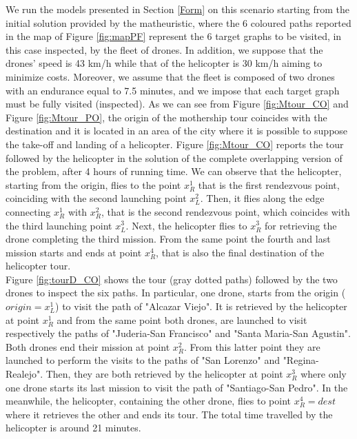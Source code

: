 \documentclass[10pt,a4paper]{elsarticle}
\newcommand{\EN}[1]{{\color{black}#1}}
\begin{document}
\noindent
We run the models presented in Section \ref{Form} on this scenario starting from the initial solution provided by the matheuristic, where the 6 coloured paths reported in the map of Figure \ref{fig:mapPF} represent the 6 target graphs to be visited, in this case inspected, by the fleet of drones. In addition, we suppose that the drones' speed is 43 km/h while that of the helicopter is  30 km/h aiming to minimize costs.
Moreover, we assume that the fleet is composed \EN{of} two drones with an endurance equal to 7.5 minutes, and we impose that each target graph must be fully visited (inspected).  As we can see from Figure \ref{fig:Mtour_CO} and Figure \ref{fig:Mtour_PO}, the origin of the mothership tour coincides with the destination and it is located in an area of the city where it is possible to \EN{suppose} the take-off and landing of \EN{a} helicopter. Figure \ref{fig:Mtour_CO} reports the tour followed by the helicopter in the solution of the complete overlapping version of the problem, after 4 hours of running time. We can observe that the helicopter, starting from the origin, flies to the point $x_R^1$ that is the first rendezvous point, coinciding with the second launching point $x_L^2$. Then, it flies along the edge connecting $x_R^1$ with $x_R^2$, that is the second rendezvous point, which coincides with the third launching point $x_L^3$. Next, the helicopter flies to $x_R^3$ for retrieving the \EN{drone completing the third mission}. From the same point the fourth and last mission starts and ends at point $x_R^4$, that is also the final destination of the helicopter tour.\\
Figure \ref{fig:tourD_CO} shows the tour (gray dotted paths) followed by the two drones \EN{to inspect} the six paths. In particular, one drone, starts from the origin ($origin=x_L^1$) \EN{to visit} the path of "Alcazar Viejo". It is retrieved by the helicopter at point $x_R^1$ and from the same point both drones, are launched to visit respectively the paths of "Juderia-San Francisco" and "Santa Maria-San Agustin". Both drones end their mission at point $x_R^2$. From this latter point they are launched to perform the visits to the paths of "San Lorenzo" and "Regina-Realejo". Then, they are both retrieved by the  helicopter at point $x_R^3$ where only one drone starts its last mission to visit the path of "Santiago-San Pedro". In the meanwhile, the helicopter, containing the other drone, flies to point $x_R^4=dest$ where it retrieves the other and ends its tour.
The total time travelled by the helicopter is around 21 minutes.
\end{document}
